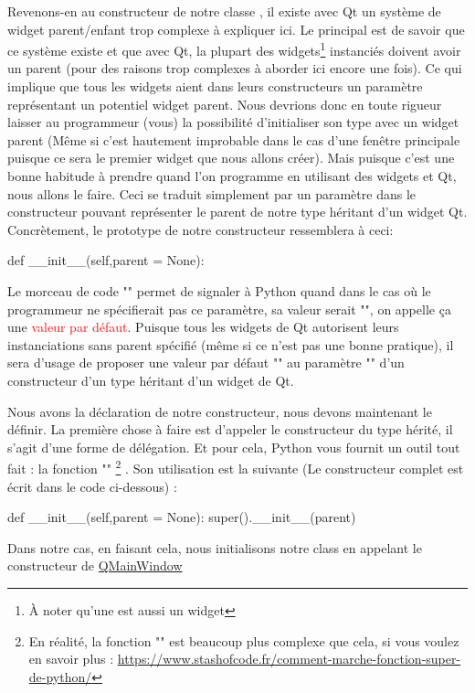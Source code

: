 Revenons-en au constructeur de notre classe , il existe avec Qt un système de widget parent/enfant trop complexe à expliquer ici. Le principal est de savoir que ce système existe et que avec Qt, la plupart des widgets\footnote{À noter qu'une  est aussi un widget} instanciés doivent avoir un parent (pour des raisons trop complexes à aborder ici encore une fois). Ce qui implique que tous les widgets aient dans leurs constructeurs un paramètre représentant un potentiel widget parent.\vskip 0cm %
Nous devrions donc en toute rigueur laisser au programmeur (vous) la possibilité d'initialiser son type avec un widget parent (Même si c'est hautement improbable dans le cas d'une fenêtre principale puisque ce sera le premier widget que nous allons créer). Mais puisque c'est une bonne habitude à prendre quand l'on programme en utilisant des widgets et Qt, nous allons le faire.\newline
Ceci se traduit simplement par un paramètre  dans le constructeur pouvant représenter le parent de notre type héritant d'un widget Qt.\newline
Concrètement, le prototype de notre constructeur ressemblera à ceci:
\begin{pyCode}
def __init__(self,parent = None):
\end{pyCode}
Le morceau de code "" permet de signaler à Python quand dans le cas où le programmeur ne spécifierait pas ce paramètre, sa valeur serait "", on appelle ça une \textcolor{red}{valeur par défaut}.\newline
Puisque tous les widgets de Qt autorisent leurs instanciations sans parent spécifié (même si ce n'est pas une bonne pratique), il sera d'usage de proposer une valeur par défaut "" au paramètre "" d'un constructeur d'un type héritant d'un widget de Qt.\smallSkip

Nous avons la déclaration de notre constructeur, nous devons maintenant le définir.\newline
La première chose à faire est d'appeler le constructeur du type hérité, il s'agit d'une forme de délégation. Et pour cela, Python vous fournit un outil tout fait : la fonction ""
\footnote
{
En réalité, la fonction "" est beaucoup plus complexe que cela, si vous voulez en savoir plus : \url{https://www.stashofcode.fr/comment-marche-fonction-super-de-python/}
}
. Son utilisation est la suivante (Le constructeur complet est écrit dans le code ci-dessous) :
\begin{pyCode}
def __init__(self,parent = None):
		super().__init__(parent)
\end{pyCode}
Dans notre cas, en faisant cela, nous initialisons notre class en appelant le constructeur de \href{https://doc.qt.io/qt-5/qmainwindow.html}{QMainWindow}\newpage

